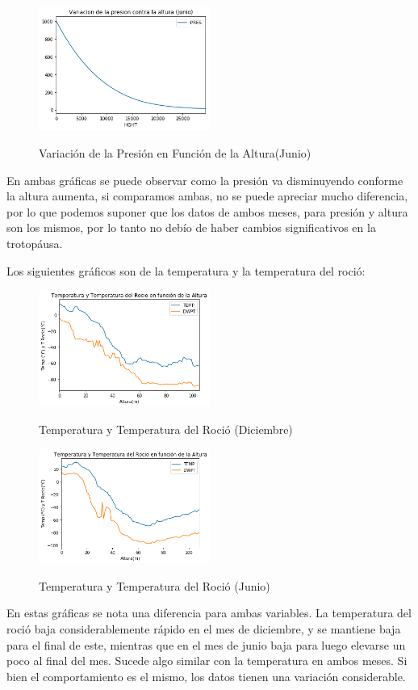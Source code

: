 \documentclass{article}
\begin{document}
\begin{figure}[H]
    \caption{Variación de la Presión en Función de la Altura(Junio)}
    \includegraphics[width=0.5\textwidth]{VarPresion-AlturaJun.png}
    \centering
    \label{Pre-Alt}
\end{figure}
En ambas gráficas se puede observar como la presión va disminuyendo conforme la altura aumenta, si comparamos ambas, no se puede apreciar mucho diferencia, por lo que podemos suponer que los datos de ambos meses, para presión y altura son los mismos, por lo tanto no debío de haber cambios significativos en la trotopáusa.

Los siguientes gráficos son de la temperatura y la temperatura del roció:
\begin{figure}[H]
    \caption{Temperatura y Temperatura del Roció (Diciembre)}
    \includegraphics[width=0.5\textwidth]{TemperaturasDic.png}
    \centering
    \label{TEMPS}
\end{figure}
\begin{figure}[H]
    \caption{Temperatura y Temperatura del Roció (Junio)}
    \includegraphics[width=0.5\textwidth]{TemperaturasJun.png}
    \centering
    \label{TEMPS}
\end{figure}
En estas gráficas se nota una diferencia para ambas variables. La temperatura del roció baja considerablemente rápido en el mes de diciembre, y se mantiene baja para el final de este, mientras que en el mes de junio baja para luego elevarse un poco al final del mes. Sucede algo similar con la temperatura en ambos meses. Si bien el comportamiento es el mismo, los datos tienen una variación considerable.
\end{document}
